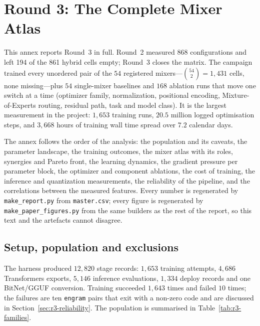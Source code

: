 
\section{Round 3: The Complete Mixer Atlas}
\label{sec:annex-experiment-3}

This annex reports Round~3 in full. Round~2 measured 868 configurations and left 194 of the 861 hybrid cells empty; Round~3 closes the matrix. The campaign trained every unordered pair of the $54$ registered mixers---$\binom{54}{2}=1{,}431$ cells, none missing---plus $54$ single-mixer baselines and $168$ ablation runs that move one switch at a time (optimizer family, normalization, positional encoding, Mixture-of-Experts routing, residual path, task and model class). It is the largest measurement in the project: $1{,}653$ training runs, $20.5$ million logged optimisation steps, and $3{,}668$ hours of training wall time spread over $7.2$ calendar days.

The annex follows the order of the analysis: the population and its caveats, the parameter landscape, the training outcomes, the mixer atlas with its roles, synergies and Pareto front, the learning dynamics, the gradient pressure per parameter block, the optimizer and component ablations, the cost of training, the inference and quantization measurements, the reliability of the pipeline, and the correlations between the measured features. Every number is regenerated by \texttt{make\_report.py} from \texttt{master.csv}; every figure is regenerated by \texttt{make\_paper\_figures.py} from the same builders as the rest of the report, so this text and the artefacts cannot disagree.

\subsection{Setup, population and exclusions}

The harness produced $12{,}820$ stage records: $1{,}653$ training attempts, $4{,}686$ Transformers exports, $5{,}146$ inference evaluations, $1{,}334$ deploy records and one BitNet/GGUF conversion. Training succeeded $1{,}643$ times and failed $10$ times; the failures are ten \texttt{engram} pairs that exit with a non-zero code and are discussed in Section~\ref{sec:r3-reliability}. The population is summarised in Table~\ref{tab:r3-families}.

